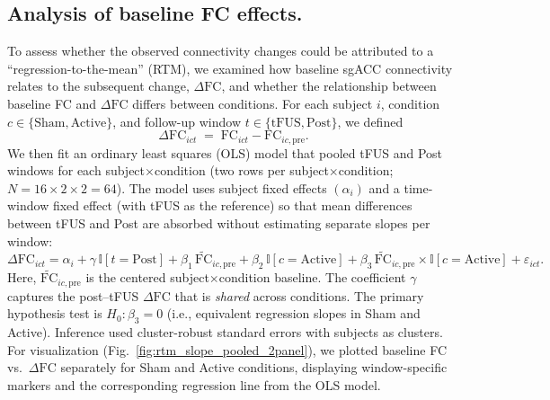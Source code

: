 \subsection*{Analysis of baseline FC effects.}
\noindent
To assess whether the observed connectivity changes could be attributed to a ``regression-to-the-mean'' (RTM), we examined how baseline sgACC connectivity relates to the subsequent change, \(\Delta \mathrm{FC}\), and whether the relationship between baseline FC and $\Delta \mathrm{FC}$ differs between conditions. For each subject \(i\), condition \(c\in\{\text{Sham},\text{Active}\}\), and follow-up window \(t\in\{\text{tFUS},\text{Post}\}\), we defined
\[
\Delta \mathrm{FC}_{ict} \;=\; \mathrm{FC}_{ict} - \mathrm{FC}_{ic,\mathrm{pre}}.
\]
We then fit an ordinary least squares (OLS) model that pooled tFUS and Post windows for each subject\(\times\)condition (two rows per subject\(\times\)condition; \(N=16\times 2\times 2=64\)). The model uses subject fixed effects \((\alpha_i)\) and a time-window fixed effect (with tFUS as the reference) so that mean differences between tFUS and Post are absorbed without estimating separate slopes per window:
\[
\Delta \mathrm{FC}_{ict}
= \alpha_i
+ \gamma\,\mathbb{I}[t=\text{Post}]
+ \beta_1\,\widetilde{\mathrm{FC}}_{ic,\mathrm{pre}}
+ \beta_2\,\mathbb{I}[c=\text{Active}]
+ \beta_3\,\widetilde{\mathrm{FC}}_{ic,\mathrm{pre}}\times \mathbb{I}[c=\text{Active}]
+ \varepsilon_{ict}.
\]
Here, \(\widetilde{\mathrm{FC}}_{ic,\mathrm{pre}}\) is the centered subject\(\times\)condition baseline. The coefficient \(\gamma\) captures the post--tFUS \(\Delta \mathrm{FC}\) that is \emph{shared} across conditions. The primary hypothesis test is \(H_0:\beta_3=0\) (i.e., equivalent regression slopes in Sham and Active). Inference used cluster-robust standard errors with subjects as clusters. For visualization (Fig.~\ref{fig:rtm_slope_pooled_2panel}), we plotted baseline FC vs.\ \(\Delta \mathrm{FC}\) separately for Sham and Active conditions, displaying window-specific markers and the corresponding regression line from the OLS model.


